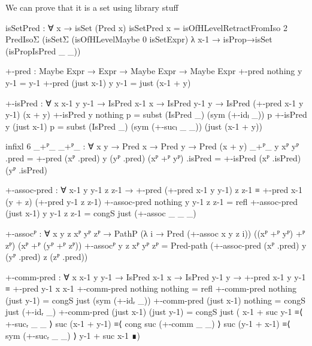 We can prove that it is a set using library stuff
\begin{code}
  isSetPred : ∀ x → isSet (Pred x)
  isSetPred x =
    isOfHLevelRetractFromIso 2 PredIsoΣ
      (isSetΣ (isOfHLevelMaybe 0 isSetExpr) λ x-1 →
        isProp→isSet (isPropIsPred _ _))
\end{code}
\begin{code}
  +-pred : Maybe Expr → Expr → Maybe Expr → Maybe Expr
  +-pred nothing y y-1 = y-1
  +-pred (just x-1) y y-1 = just (x-1 + y)

  +-isPred :
    ∀ {x x-1 y y-1} →
    IsPred x-1 x → IsPred y-1 y → IsPred (+-pred x-1 y y-1) (x + y)
  +-isPred {y} nothing p = subst (IsPred _) (sym (+-idₗ _)) p
  +-isPred {y} (just x-1) p =
    subst (IsPred _) (sym (+-sucₗ _ _)) (just (x-1 + y))

  infixl 6 _+ᴾ_
  _+ᴾ_ : ∀ {x y} → Pred x → Pred y → Pred (x + y)
  _+ᴾ_ {y} xᴾ yᴾ .pred = +-pred (xᴾ .pred) y (yᴾ .pred)
  (xᴾ +ᴾ yᴾ) .isPred = +-isPred (xᴾ .isPred) (yᴾ .isPred)
\end{code}
\begin{code}[hide]
  +-assoc-pred :
    ∀ x-1 y y-1 z z-1 →
    +-pred (+-pred x-1 y y-1) z z-1 ≡ +-pred x-1 (y + z) (+-pred y-1 z z-1)
  +-assoc-pred nothing y y-1 z z-1 = refl
  +-assoc-pred (just x-1) y y-1 z z-1 = congS just (+-assoc _ _ _)

  +-assocᴾ :
    ∀ {x y z} xᴾ yᴾ zᴾ →
    PathP (λ i → Pred (+-assoc x y z i)) ((xᴾ +ᴾ yᴾ) +ᴾ zᴾ) (xᴾ +ᴾ (yᴾ +ᴾ zᴾ))
  +-assocᴾ {y} {z} xᴾ yᴾ zᴾ =
    Pred-path (+-assoc-pred (xᴾ .pred) y (yᴾ .pred) z (zᴾ .pred))
\end{code}
\begin{code}
  +-comm-pred :
    ∀ {x x-1 y y-1} → IsPred x-1 x → IsPred y-1 y →
    +-pred x-1 y y-1 ≡ +-pred y-1 x x-1
  +-comm-pred nothing nothing = refl
  +-comm-pred nothing (just y-1) = congS just (sym (+-idᵣ _))
  +-comm-pred (just x-1) nothing = congS just (+-idᵣ _)
  +-comm-pred (just x-1) (just y-1) =
    congS just
      ( x-1 + suc y-1   ≡⟨ +-sucᵣ _ _ ⟩
        suc (x-1 + y-1) ≡⟨ cong suc (+-comm _ _) ⟩
        suc (y-1 + x-1) ≡⟨ sym (+-sucᵣ _ _) ⟩
        y-1 + suc x-1   ∎)
\end{code}
